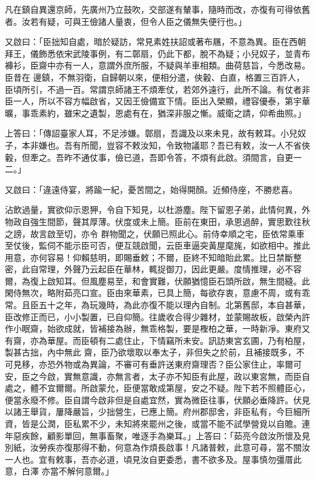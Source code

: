 \begin{pinyinscope}
 凡在鎮自異還京師，先廣州乃立鼓吹，交部遂有輦事，隨時而改，亦復有可得依舊者。汝若有疑，可與王儉諸人量衷，但令人臣之儀無失便行也。」



 又啟曰：「臣拙知自處，暗於疑訪，常見素姓扶詔或著布屩，不意為異。臣在西朝拜王，儀飾悉依宋武陵事例，有二鄣扇，仍此下都，脫不為疑；小兒奴子，並青布褲衫，臣齋中亦有一人，意謂外庶所服，不疑與羊車相類。曲荷慈旨，今悉改易。臣昔在
 邊鎮，不無羽衛，自歸朝以來，便相分遣，俠轂、白直，格置三百許人，臣頃所引，不過一百。常謂京師諸王不煩牽仗，若郊外遠行，此所不論。有仗者非臣一人，所以不容方幅啟省，又因王儉備宣下情。臣出入榮顯，禮容優泰，第宇華曠，事乖素約，雖宋之遺製，恩處有在，猶深非服之慚。威衛之請，仰希曲照。」



 上答曰：「傳詔臺家人耳，不足涉嫌。鄣扇，吾識及以來未見，故有敕耳。小兒奴子，本非嫌也。吾有所聞，豈容不敕汝知，令致物議耶？吾已有敕，汝一人不省俠轂，但牽之。吾昨不通仗事，儉已道，吾即令答，不煩有此啟。須間言，自更一二。」



 又啟曰：「違遠侍宴，將踰一紀，憂苦間之，始得開顏。近頻侍座，不勝悲喜。



 沾飲過量，實欲仰示恩狎，令自下知見，以杜游塵。陛下留恩子弟，此情何異，外物政自強生間節，聲其厚薄。伏度或未上簡。臣前在東田，承恩過醉，實思歎往秋之謗，故言啟至切，亦令
 群物聞之，伏願已照此心。前侍幸順之宅，臣依常乘車至仗後，監伺不能示臣可否，便互競啟聞，云臣車逼突黃屋麾旄，如欲相中。推此用意，亦何容易！仰賴慈明，即賜垂敕；不爾，臣終不知暗貽此累。比日禁斷整密，此自常理，外聲乃云起臣在華林，輒捉御刀，因此更嚴。度情推理，必不容爾，為復上啟知耳。但風塵易至，和會實難，伏願猶憶臣石頭所啟，無生間縫。此閑侍無次，略附茹亮口宣。臣由來華素，已具上簡，每欲存衷，意慮不周，或有乖常。且臣五十之年，為玩幾時，為此亦復不能以理內自制。北第舊邸，本自甚華，臣改修正而已，小小製置，已自仰簡。往歲收合得少雜材，並蒙賜故板，啟榮內許作小眠齋，始欲成就，皆補接為辦，無乖格製，要是檉柏之華，一時新凈。東府又有齋，亦為華屋。而臣頓有二處住止，下情竊所未安。訊訪東宮玄圃，乃有柏屋，製甚古拙，內中無此
 齋，臣乃欲壞取以奉太子，非但失之於前，且補接既多，不可見移，亦恐外物或為異論，不審可有垂許送東府齋理否？臣公家住止，率爾可安，臣之今啟，實無意識，亦無言者，太子亦不知臣有此屋，政以東宮無，而臣自處之，體不宜爾爾。所啟蒙允，臣便當敢成第屋，安之不疑。陛下若不照體臣心，便當永廢不修。臣自謂今啟非但是自處宜然，實為微臣往事，伏願必垂降許。伏見以諸王舉貨，屢降嚴旨，少拙營生，已應上簡。府州郡邸舍，非臣私有，今巨細所資，皆是公潤，臣私累不少，未知將來罷州之後，或當不能不試學營覓以自贍。連年惡疾餘，顧影單回，無事畜聚，唯逐手為樂耳。」上答曰：「茹亮今啟汝所懷及見別紙，汝勞疾亦復那得不動，何意為作煩長啟事！凡諸普敕，此意可尋，當不關汝一人也。宜有敕事，吾亦必道，頃見汝自更委悉，書不欲多及。屋事慎勿彊厝此意，白澤
 亦當不解何意爾。」




\end{pinyinscope}
